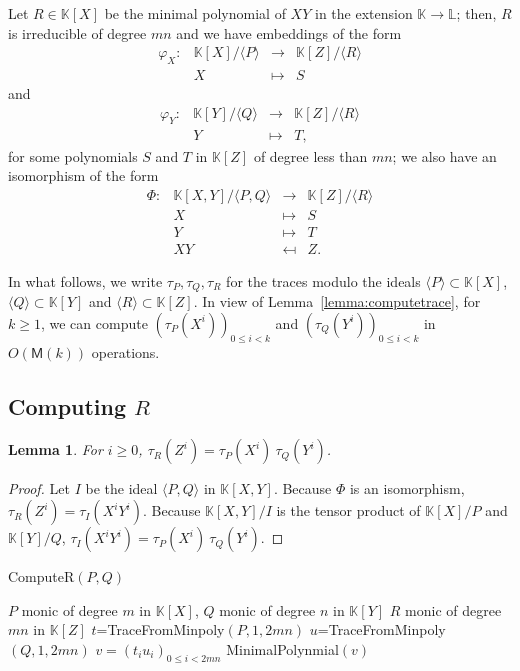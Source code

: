\documentclass[12pt]{article}
\def\M {\ensuremath{\mathsf{M}}}
\def\K {\ensuremath{\mathbb{K}}}
\def\L {\ensuremath{\mathbb{L}}}
\newtheorem{Lemma}{Lemma}
\begin{document}
Let $R \in \K[X]$ be the minimal polynomial of $XY$ in the extension
$\K\to \L$; then, $R$ is irreducible of degree $m n$ and we have embeddings
of the form
$$\begin{array}{cccc}
\varphi_X: & \K[X]/\langle P \rangle & \to & \K[Z]/\langle R \rangle\\
& X & \mapsto & S
\end{array}$$
and
$$\begin{array}{cccc}
\varphi_Y: & \K[Y]/\langle Q \rangle & \to & \K[Z]/\langle R \rangle\\
& Y & \mapsto & T,
\end{array}$$
for some polynomials $S$ and $T$ in $\K[Z]$ of degree less than $mn$; 
we also have an isomorphism of the form
$$\begin{array}{cccc} 
\Phi:&  \K[X,Y]/\langle P,Q\rangle & \to & \K[Z]/\langle R \rangle \\
&  X & \mapsto & S \\
&  Y & \mapsto & T \\
&  XY & \mapsfrom & Z.
\end{array}$$


In what follows, we write $\tau_P,\tau_Q,\tau_R$ for the traces modulo
the ideals $\langle P\rangle\subset \K[X]$, $\langle Q \rangle \subset
\K[Y]$ and $\langle R \rangle \subset \K[Z]$. In view of
Lemma~\ref{lemma:computetrace}, for $k \ge 1$, we can compute
$(\tau_P(X^i))_{0 \le i < k}$ and $(\tau_Q(Y^i))_{0 \le i < k}$
in $O(\M(k))$ operations.


\subsection{Computing $R$} 

\begin{Lemma}
  For $i \ge 0$, $\tau_R(Z^i) = \tau_P(X^i) \ \tau_Q(Y^i)$.
\end{Lemma}
\begin{proof}
  Let $I$ be the ideal $\langle P, Q\rangle$ in $\K[X,Y]$. Because $\Phi$ is
  an isomorphism, $\tau_R(Z^i) = \tau_I(X^i Y^i)$. Because $\K[X,Y]/I$
  is the tensor product of $\K[X]/P$ and $\K[Y]/Q$, $\tau_I(X^i
  Y^i)=\tau_P(X^i) \ \tau_Q(Y^i)$.
\end{proof}

\begin{algorithm}[H]
  \caption{ComputeR$(P, Q)$}
  \begin{algorithmic}[1]
    \REQUIRE $P$ monic of degree $m$ in $\K[X]$, $Q$ monic of degree $n$ in $\K[Y]$
    \ENSURE $R$ monic of degree $mn$ in $\K[Z]$
    \STATE  $t$=TraceFromMinpoly$(P,1,2mn)$
    \STATE  $u$=TraceFromMinpoly$(Q,1,2mn)$
    \STATE $v=(t_i u_i)_{0 \le i < 2mn}$
    \RETURN MinimalPolynmial$(v)$
  \end{algorithmic}
  \label{algo:R}
\end{algorithm}
\end{document}

